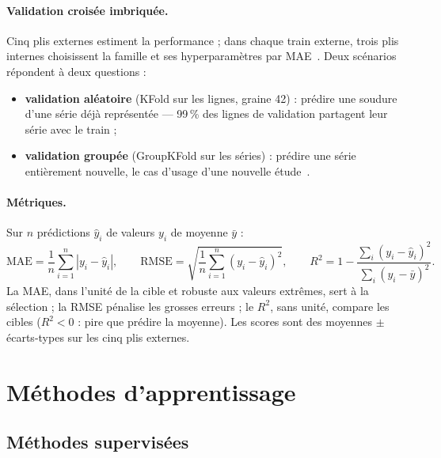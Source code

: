 \documentclass[11pt,a4paper]{article}
\begin{document}
\paragraph{Validation croisée imbriquée.} Cinq plis externes estiment la
performance ; dans chaque train externe, trois plis internes choisissent la
famille et ses hyperparamètres par MAE~\cite{varma_simon_2006,cawley_talbot_2010}.
Deux scénarios répondent à deux questions :
\begin{itemize}
  \item \textbf{validation aléatoire} (KFold sur les lignes, graine 42) : prédire une soudure d'une série déjà représentée --- 99\,\% des lignes de validation partagent leur série avec le train ;
  \item \textbf{validation groupée} (GroupKFold sur les séries) : prédire une série entièrement nouvelle, le cas d'usage d'une nouvelle étude~\cite{roberts_2017}.
\end{itemize}

\paragraph{Métriques.} Sur $n$ prédictions $\hat{y}_i$ de valeurs $y_i$ de moyenne $\bar{y}$ :
\begin{equation}
  \mathrm{MAE} = \frac{1}{n}\sum_{i=1}^{n}|y_i - \hat{y}_i|, \qquad
  \mathrm{RMSE} = \sqrt{\frac{1}{n}\sum_{i=1}^{n}(y_i - \hat{y}_i)^2}, \qquad
  R^2 = 1 - \frac{\sum_i (y_i - \hat{y}_i)^2}{\sum_i (y_i - \bar{y})^2}.
\end{equation}
La MAE, dans l'unité de la cible et robuste aux valeurs extrêmes, sert à la
sélection ; la RMSE pénalise les grosses erreurs ; le $R^2$, sans unité, compare
les cibles ($R^2 < 0$ : pire que prédire la moyenne). Les scores sont des
moyennes $\pm$ écarts-types sur les cinq plis externes.

\section{Méthodes d'apprentissage}
\label{sec:methodes}

\subsection{Méthodes supervisées}
\end{document}
